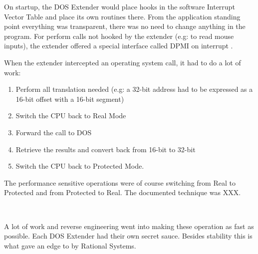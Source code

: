 \par
{}
On startup, the DOS Extender would place hooks in the software Interrupt Vector Table and place its own routines there. From the application standing point everything was transparent, there was no need to change anything in the program. For perform calls not hooked by the extender (e.g:  to read mouse inputs), the extender offered a special interface called DPMI on interrupt .\\
\par
{}
\par
When the extender intercepted an operating system call, it had to do a lot of work:
\begin{enumerate}
\item Perform all translation needed (e.g: a 32-bit address had to be expressed as a 16-bit offset with a 16-bit segment)
\item Switch the CPU back to Real Mode
\item Forward the call to DOS
\item Retrieve the results and convert back from 16-bit to 32-bit
\item Switch the CPU back to Protected Mode.
\end{enumerate} 

The performance sensitive operations were of course switching from Real to Protected and from Protected to Real. The documented technique was XXX.\\
\par
{}\\
\par
{}
\par
A lot of work and reverse engineering went into making these operation as fast as possible. Each DOS Extender had their own secret sauce. Besides stability this is what gave an edge to  by Rational Systems.\\
\\
\par 
{}\\
\par
{}
\par